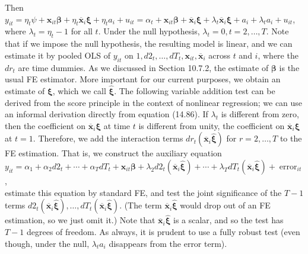 \documentclass[10pt]{article}
\begin{document}
Then\\
$y_{i t}=\eta_{t} \psi+\mathbf{x}_{i t} \boldsymbol{\beta}+\eta_{t} \overline{\mathbf{x}}_{i} \boldsymbol{\xi}+\eta_{t} a_{i}+u_{i t}=\alpha_{t}+\mathbf{x}_{i t} \boldsymbol{\beta}+\overline{\mathbf{x}}_{i} \boldsymbol{\xi}+\lambda_{t} \overline{\mathbf{x}}_{i} \boldsymbol{\xi}+a_{i}+\lambda_{t} a_{i}+u_{i t}$,\\
where $\lambda_{t}=\eta_{t}-1$ for all $t$. Under the null hypothesis, $\lambda_{t}=0, t=2, \ldots, T$. Note that if we impose the null hypothesis, the resulting model is linear, and we can estimate it by pooled OLS of $y_{i t}$ on $1, d 2_{t}, \ldots, d T_{t}, \mathbf{x}_{i t}, \overline{\mathbf{x}}_{i}$ across $t$ and $i$, where the $d r_{t}$ are time dummies. As we discussed in Section 10.7.2, the estimate of $\boldsymbol{\beta}$ is the usual FE estimator. More important for our current purposes, we obtain an estimate of $\boldsymbol{\xi}$, which we call $\hat{\boldsymbol{\xi}}$. The following variable addition test can be derived from the score principle in the context of nonlinear regression; we can use an informal derivation directly from equation (14.86). If $\lambda_{t}$ is different from zero, then the coefficient on $\overline{\mathbf{x}}_{i} \boldsymbol{\xi}$ at time $t$ is different from unity, the coefficient on $\overline{\mathbf{x}}_{i} \boldsymbol{\xi}$ at $t=1$. Therefore, we add the interaction terms $d r_{t}\left(\overline{\mathbf{x}}_{i} \hat{\boldsymbol{\xi}}\right)$ for $r=2, \ldots, T$ to the FE estimation. That is, we construct the auxiliary equation\\
$y_{i t}=\alpha_{1}+\alpha_{2} d 2_{t}+\cdots+\alpha_{T} d T_{t}+\mathbf{x}_{i t} \boldsymbol{\beta}+\lambda_{2} d 2_{t}\left(\overline{\mathbf{x}}_{i} \hat{\boldsymbol{\xi}}\right)+\cdots+\lambda_{T} d T_{t}\left(\overline{\mathbf{x}}_{i} \hat{\boldsymbol{\xi}}\right)+\operatorname{error}_{i t}$,\\
estimate this equation by standard FE, and test the joint significance of the $T-1$ terms $d 2_{t}\left(\overline{\mathbf{x}}_{i} \hat{\boldsymbol{\xi}}\right), \ldots, d T_{t}\left(\overline{\mathbf{x}}_{i} \hat{\boldsymbol{\xi}}\right)$. (The term $\overline{\mathbf{x}}_{i} \hat{\boldsymbol{\xi}}$ would drop out of an FE estimation, so we just omit it.) Note that $\overline{\mathbf{x}}_{i} \hat{\boldsymbol{\xi}}$ is a scalar, and so the test has $T-1$ degrees of freedom. As always, it is prudent to use a fully robust test (even though, under the null, $\lambda_{t} a_{i}$ disappears from the error term).
\end{document}
